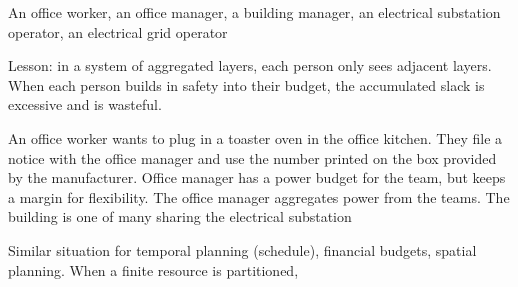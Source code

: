 An office worker, an office manager, a building manager, an electrical substation operator, an electrical grid operator

Lesson: in a system of aggregated layers, each person only sees adjacent layers. When each person builds in safety into their budget, the accumulated slack is excessive and is wasteful.

An office worker wants to plug in a toaster oven in the office kitchen. They file a notice with the office manager and use the number printed on the box provided by the manufacturer. Office manager has a power budget for the team, but keeps a margin for flexibility. The office manager aggregates power from the teams. The building is one of many sharing the electrical substation 

Similar situation for temporal planning (schedule), financial budgets, spatial planning. 
When a finite resource is partitioned, 